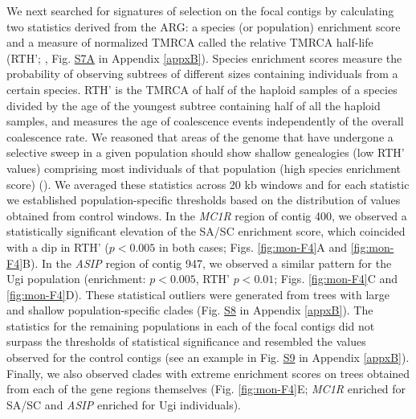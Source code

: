We next searched for signatures of selection on the focal contigs by calculating two statistics derived from the \acf{ARG}: a species (or population) enrichment score and a measure of normalized \ac{TMRCA} called the relative \ac{TMRCA} half-life (\acs{RTH}’; \cite{rasmussen_genome-wide_2014,hejase_genomic_2020}, Fig. \href{https://journals.plos.org/PLOSGENETICS/article?id=10.1371/journal.pgen.1010474#sec017}{S7A} in Appendix \ref{appxB}). Species enrichment scores measure the probability of observing subtrees of different sizes containing individuals from a certain species. \acs{RTH}’ is the \ac{TMRCA} of half of the haploid samples of a species divided by the age of the youngest subtree containing half of all the haploid samples, and measures the age of coalescence events independently of the overall coalescence rate. We reasoned that areas of the genome that have undergone a selective sweep in a given population should show shallow genealogies (low \acs{RTH}’ values) comprising most individuals of that population (high species enrichment score) (\cite{hejase_genomic_2020}). We averaged these statistics across 20 kb windows and for each statistic we established population-specific thresholds based on the distribution of values obtained from control windows. In the \textit{MC1R} region of contig 400, we observed a statistically significant elevation of the \ac{SA/SC} enrichment score, which coincided with a dip in \acs{RTH}’ ($p<0.005$ in both cases; Figs. \ref{fig:mon-F4}A and \ref{fig:mon-F4}B). In the \textit{ASIP} region of contig 947, we observed a similar pattern for the Ugi population (enrichment: $p<0.005$, \acs{RTH}’ $p<0.01$; Figs. \ref{fig:mon-F4}C and \ref{fig:mon-F4}D). These statistical outliers were generated from trees with large and shallow population-specific clades (Fig. \href{https://journals.plos.org/PLOSGENETICS/article?id=10.1371/journal.pgen.1010474#sec017}{S8} in Appendix \ref{appxB}). The statistics for the remaining populations in each of the focal contigs did not surpass the thresholds of statistical significance and resembled the values observed for the control contigs (see an example in Fig. \href{https://journals.plos.org/PLOSGENETICS/article?id=10.1371/journal.pgen.1010474#sec017}{S9} in Appendix \ref{appxB}). Finally, we also observed clades with extreme enrichment scores on trees obtained from each of the gene regions themselves (Fig. \ref{fig:mon-F4}E; \textit{MC1R} enriched for \ac{SA/SC} and \textit{ASIP} enriched for Ugi individuals).

